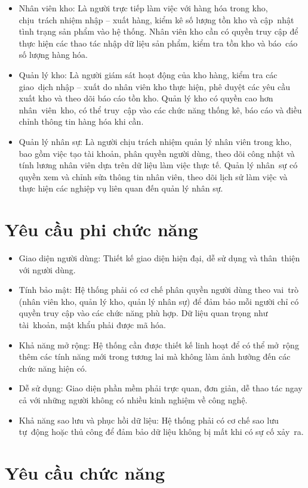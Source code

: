 \documentclass[a4paper,12pt]{report}
\begin{document}
\begin{itemize}
    \item Nhân viên kho: Là người trực tiếp làm việc với hàng hóa trong kho, chịu~trách nhiệm nhập – xuất hàng, kiểm kê số lượng tồn kho và cập~nhật tình trạng sản phẩm vào hệ thống. Nhân viên kho cần có quyền truy cập để thực hiện các thao tác nhập dữ liệu sản phẩm, kiểm tra tồn kho và báo~cáo số lượng hàng hóa.
    \item Quản lý kho: Là người giám sát hoạt động của kho hàng, kiểm tra các giao~dịch nhập – xuất do nhân viên kho thực hiện, phê duyệt các yêu cầu xuất kho và theo dõi báo cáo tồn kho. Quản lý kho có quyền cao hơn nhân~viên~kho, có thể truy~cập vào các chức năng thống kê, báo cáo và điều chỉnh thông tin hàng hóa khi cần.
    \item Quản lý nhân sự: Là người chịu trách nhiệm quản lý nhân viên trong kho, bao gồm việc tạo tài khoản, phân quyền người dùng, theo dõi công nhật và tính lương nhân viên dựa trên dữ liệu làm việc thực tế. Quản lý nhân~sự có quyền xem và chỉnh sửa thông tin nhân viên, theo dõi lịch sử làm việc và thực hiện các nghiệp vụ liên quan đến quản lý nhân sự.
\end{itemize}
\section{Yêu cầu phi chức năng}
\begin{itemize}
    \item Giao diện người dùng: Thiết kế giao diện hiện đại, dễ sử dụng và thân~thiện với người dùng.
    \item Tính bảo mật: Hệ thống phải có cơ chế phân quyền người dùng theo vai~trò (nhân viên kho, quản lý kho, quản lý nhân sự) để đảm bảo mỗi người chỉ có quyền truy cập vào các chức năng phù hợp. Dữ liệu quan trọng như tài~khoản, mật khẩu phải được mã hóa.
    \item Khả năng mở rộng: Hệ thống cần được thiết kế linh hoạt để có thể mở~rộng thêm các tính năng mới trong tương lai mà không làm ảnh hưởng đến các chức năng hiện có.
    \item Dễ sử dụng: Giao diện phần mềm phải trực quan, đơn giản, dễ thao tác ngay cả với những người không có nhiều kinh nghiệm về công nghệ.
    \item Khả năng sao lưu và phục hồi dữ liệu: Hệ thống phải có cơ chế sao lưu tự~động hoặc thủ công để đảm bảo dữ liệu không bị mất khi có sự cố xảy~ra.
\end{itemize}
\section{Yêu cầu chức năng}
\end{document}

